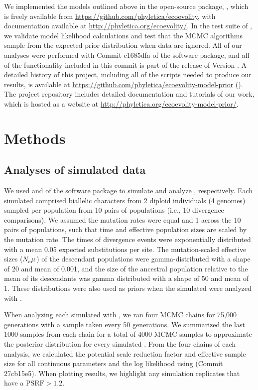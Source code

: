 \documentclass[letterpaper,12pt]{article}
\begin{document}
We implemented the models outlined above in the open-source \cpp package,
\ecoevolity, which is freely available from
\url{https://github.com/phyletica/ecoevolity}, with documentation available
at
\url{http://phyletica.org/ecoevolity/}.
In the test suite of \ecoevolity, we validate model likelihood calculations and
test that the MCMC algorithms sample from the expected prior distribution when
data are ignored.
All of our analyses were performed with
Commit c1685dfa
of the \ecoevolity software package,
and all of the functionality included in this commit is part of
the release of Version .
A detailed history of this project, including all of the scripts
needed to produce our results, is available at
\url{https://github.com/phyletica/ecoevolity-model-prior}
().
The project repository includes detailed documentation and tutorials of our
work, which is hosted as a website at
\url{http://phyletica.org/ecoevolity-model-prior/}.

\section{Methods}

\subsection{Analyses of simulated data}

We used \simcoevolity and \ecoevolity of the \ecoevolity software
package
\citep[Commit c1685dfa][]{Oaks2018ecoevolity}
to simulate and analyze \datasets, respectively.
Each simulated \dataset comprised biallelic characters from 2 diploid
individuals (4 genomes) sampled per population from 10 pairs of populations
(i.e., 10 divergence comparisons).
We assumed the mutation rates were equal and 1 across the 10 pairs of
populations, such that time and effective population sizes are scaled by the
mutation rate.
The times of divergence events were exponentially distributed with a mean 0.05
expected substitutions per site.
The mutation-scaled effective sizes ($N_{e}^{}\mu_{}$) of the descendant
populations were gamma-distributed with a shape of 20 and mean of 0.001,
and the size of the ancestral population relative to the mean of its
descendants was gamma distributed with a shape of 50 and mean of 1.
These distributions were also used as priors when the simulated \datasets were
analyzed with \ecoevolity.


When analyzing each simulated \dataset with \ecoevolity,
we ran four MCMC chains for 75,000 generations with a sample taken every 50
generations.
We summarized the last 1000 samples from each chain for a total of 4000 MCMC
samples to approximate the posterior distribution for every simulated \dataset.
From the four chains of each analysis, we calculated the potential
scale reduction factor \citep[PSRF; the square root of Equation 1.1
in][]{Brooks1998} and effective sample size \citep[ESS;][]{Gong2014} for all
continuous parameters and the log likelihood using
\pycoevolity (Commit 27cb15e5).
When plotting results, we highlight any simulation replicates that have a
$\textrm{PSRF} > 1.2$.
\end{document}
